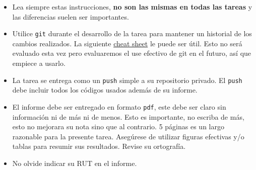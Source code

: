 \documentclass[letter, 11pt]{article}
\begin{document}
%
%
%



\vspace{1em}
\begin{itemize}
  
  \item Lea siempre estas instrucciones, {\bf no son las mismas en todas las
    tareas} y las diferencias suelen ser importantes.

  \item Utilice \texttt{git} durante el desarrollo de la tarea para mantener un
    historial de los cambios realizados. La siguiente
    \href{https://education.github.com/git-cheat-sheet-education.pdf}{cheat
    sheet} le puede ser útil. Esto no será evaluado esta vez pero evaluaremos
    el use efectivo de git en el futuro, así que empiece a usarlo.

  \item La tarea se entrega como un \texttt{push} simple a su repositorio
    privado. El \texttt{push} debe incluir todos los códigos usados además de
    su informe.

  \item El informe debe ser entregado en formato \texttt{pdf}, este debe ser
    claro sin información ni de más ni de menos. Esto es importante, no escriba
    de más, esto no mejorara su nota sino que al contrario. 5 páginas es un
    largo razonable para la presente tarea.  Asegúrese de utilizar figuras
    efectivas y/o tablas para resumir sus resultados. Revise su ortografía.

  \item No olvide indicar su RUT en el informe.

\end{itemize}

\end{document}
